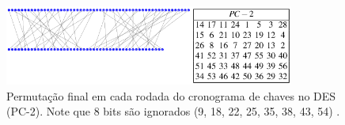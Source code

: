 \begin{frame}[allowframebreaks]
 \framebreak

\begin{figure}[h]
\centering
\includegraphics[width=0.85\textwidth,height=0.65\textheight,keepaspectratio]{figures/DES-keyschedule-PC2.png}
\caption{Permutação final em cada rodada do cronograma de chaves no DES (PC-2). Note que 8 bits são ignorados (9, 18, 22, 25, 35, 38, 43, 54) \cite{wikides2023, paar2014}.}
\label{fig-DES-keyschedule-PC2}
\end{figure}

\end{frame}



